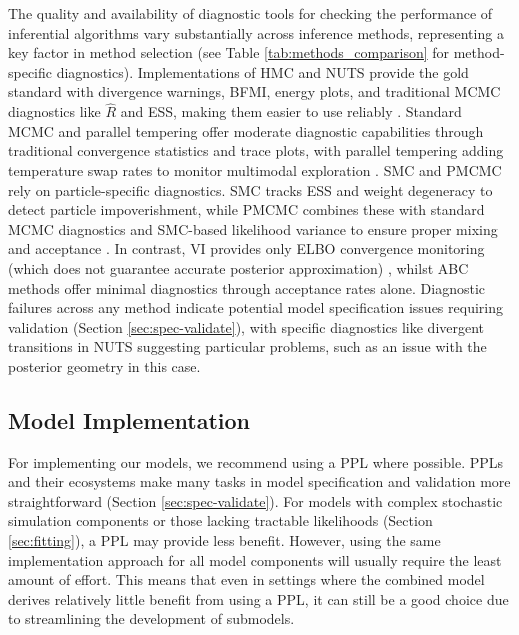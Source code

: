 \documentclass{article}
\begin{document}
The quality and availability of diagnostic tools for checking the performance of inferential algorithms vary substantially across inference methods, representing a key factor in method selection (see Table \ref{tab:methods_comparison} for method-specific diagnostics).
Implementations of \ac{HMC} and \ac{NUTS} provide the gold standard with divergence warnings, \ac{BFMI}, energy plots, and traditional \ac{MCMC} diagnostics like $\hat{R}$ and \ac{ESS}, making them easier to use reliably \citep{betancourt2017conceptual, carpenter2017stan}.
 Standard \ac{MCMC} and parallel tempering offer moderate diagnostic capabilities through traditional convergence statistics and trace plots, with parallel tempering adding temperature swap rates to monitor multimodal exploration \citep{honkela2020computational}. \ac{SMC} and \ac{PMCMC} rely on particle-specific diagnostics. \ac{SMC} tracks \ac{ESS} and weight degeneracy to detect particle impoverishment, while \ac{PMCMC} combines these with standard \ac{MCMC} diagnostics and \ac{SMC}-based likelihood variance to ensure proper mixing and acceptance \citep{michaud2021sequential, andrieu2010particle}.  In contrast, \ac{VI} provides only \ac{ELBO} convergence monitoring (which does not guarantee accurate posterior approximation) \citep{blei2017variational, chatzilena2019contemporary}, whilst \ac{ABC} methods offer minimal diagnostics through acceptance rates alone.
Diagnostic failures across any method indicate potential model specification issues requiring validation (Section \ref{sec:spec-validate}), with specific diagnostics like divergent transitions in \ac{NUTS} suggesting particular problems, such as an issue with the posterior geometry in this case.

\subsection{Model Implementation}\label{sec:implementation}

For implementing our models, we recommend using a \ac{PPL} where possible.
\ac{PPL}s and their ecosystems make many tasks in model specification and validation more straightforward (Section \ref{sec:spec-validate}).
For models with complex stochastic simulation components or those lacking tractable likelihoods (Section \ref{sec:fitting}), a \ac{PPL} may provide less benefit.
However, using the same implementation approach for all model components will usually require the least amount of effort.
This means that even in settings where the combined model derives relatively little benefit from using a  \ac{PPL}, it can still be a good choice due to streamlining the development of submodels.
\end{document}

